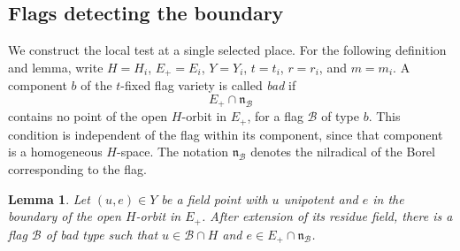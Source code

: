 \documentclass[11pt]{article}
\numberwithin{equation}{section}
\newtheorem{lemma}[theorem]{Lemma}
\theoremstyle{definition}
\theoremstyle{remark}
\begin{document}
\subsection{Flags detecting the boundary}

We construct the local test at a single selected place.  For the
following definition and lemma, write $H=H_i$, $E_+=E_i$, $Y=Y_i$,
$t=t_i$, $r=r_i$, and $m=m_i$.  A component $b$ of the $t$-fixed flag variety is
called \emph{bad} if
\[
 E_+\cap\mathfrak n_{\mathcal B}
\]
contains no point of the open $H$-orbit in $E_+$, for a flag
$\mathcal B$ of type $b$.  This condition is independent of the flag
within its component, since that component is a homogeneous $H$-space.
The notation $\mathfrak n_{\mathcal B}$ denotes the nilradical of the
Borel corresponding to the flag.

\begin{lemma}\label{boundary:bad-flag}
Let $(u,e)\in Y$ be a field point with $u$ unipotent and $e$ in the
boundary of the open $H$-orbit in $E_+$.  After extension of its residue
field, there is a flag $\mathcal B$ of bad type such that
$u\in\mathcal B\cap H$ and $e\in E_+\cap\mathfrak n_{\mathcal B}$.
\end{lemma}
\end{document}
